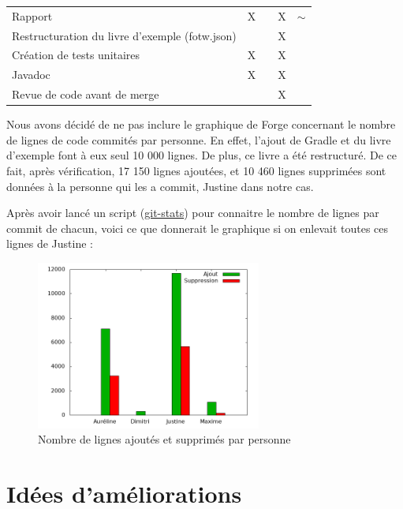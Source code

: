 \begin{centering}
\begin{longtable}{|p{8cm}|c|c|c|c|}
				\rowcolor{lightgray} \multicolumn{5}{|c|}{ \textbf{Autre}}\\
				\hline
				Rapport & X & & X & $\sim$\\
				\hline
				Restructuration du livre d'exemple (fotw.json) & & & X & \\
				\hline
				Création de tests unitaires & X & & X & \\
				\hline
				Javadoc & X & & X & \\
				\hline
				Revue de code avant de merge & & & X & \\
				\hline
			\end{longtable}
		\end{centering}

		Nous avons décidé de ne pas inclure le graphique de Forge concernant le nombre de lignes de code commités par personne. En effet, l'ajout de Gradle et du livre d'exemple font à eux seul 10 000 lignes. De plus, ce livre a été restructuré. De ce fait, après vérification, 17 150 lignes ajoutées, et 10 460 lignes supprimées sont données à la personne qui les a commit, Justine dans notre cas.

		Après avoir lancé un script (\href{https://gist.github.com/jmartin-pro/64059d16f659421d3ddf3cd43ba75e50}{git-stats}) pour connaitre le nombre de lignes par commit de chacun, voici ce que donnerait le graphique si on enlevait toutes ces lignes de Justine :

		\begin{figure}[H]
			\centering\includegraphics[width=0.66\textwidth, keepaspectratio]{img/repo_stats.png}
			\caption{Nombre de lignes ajoutés et supprimés par personne}
		\end{figure}

	\section{Idées d'améliorations}

